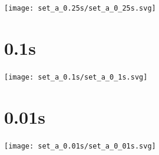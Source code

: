 \documentclass{article}
\begin{document}
    \begin{center}
    \texttt{[image: set\_a\_0.25s/set\_a\_0\_25s.svg]}
    \end{center}
\clearpage

\section{0.1s}
    \noindent\begin{minipage}{.45\textwidth}
    
    \end{minipage}\hfill
    \begin{minipage}{.45\textwidth}
    
    \end{minipage}
    
    \begin{center}
    \texttt{[image: set\_a\_0.1s/set\_a\_0\_1s.svg]}
    \end{center}
\clearpage

\section{0.01s}
    \noindent\begin{minipage}{.45\textwidth}
    
    \end{minipage}\hfill
    \begin{minipage}{.45\textwidth}
    
    \end{minipage}
    
    \begin{center}
    \texttt{[image: set\_a\_0.01s/set\_a\_0\_01s.svg]}
    \end{center}
\clearpage


\end{document}
